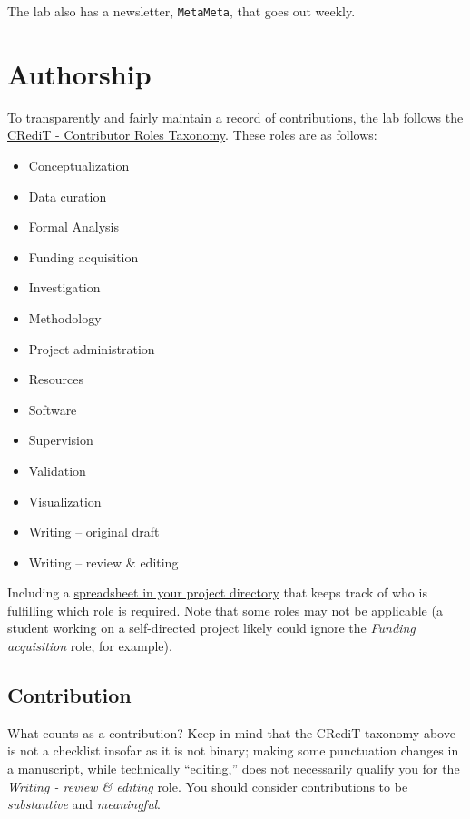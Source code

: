 \documentclass[]{tufte-book}
\providecommand{\tightlist}{%
  \setlength{\itemsep}{0pt}\setlength{\parskip}{0pt}}
\begin{document}
The lab also has a newsletter, \texttt{MetaMeta}, that goes out weekly.

\hypertarget{authorship}{%
\section{Authorship}\label{authorship}}

To transparently and fairly maintain a record of contributions, the lab follows the \href{https://casrai.org/credit/}{CRediT - Contributor Roles Taxonomy}. These roles are as follows:

\begin{itemize}
\tightlist
\item
  Conceptualization
\item
  Data curation
\item
  Formal Analysis
\item
  Funding acquisition
\item
  Investigation
\item
  Methodology
\item
  Project administration
\item
  Resources
\item
  Software
\item
  Supervision
\item
  Validation
\item
  Visualization
\item
  Writing -- original draft
\item
  Writing -- review \& editing
\end{itemize}

Including a \href{https://osf.io/wj3hb/}{spreadsheet in your project directory} that keeps track of who is fulfilling which role is required. Note that some roles may not be applicable (a student working on a self-directed project likely could ignore the \emph{Funding acquisition} role, for example).

\hypertarget{contribution}{%
\subsection{Contribution}\label{contribution}}

What counts as a contribution? Keep in mind that the CRediT taxonomy above is not a checklist insofar as it is not binary; making some punctuation changes in a manuscript, while technically ``editing,'' does not necessarily qualify you for the \emph{Writing - review \& editing} role. You should consider contributions to be \emph{substantive} and \emph{meaningful}.
\end{document}
